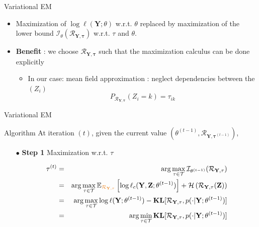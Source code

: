 \documentclass[compress,10pt]{beamer}
\newcommand{\bX}{\mathbf{Y}}
\newcommand{\Xall}{\mathbf{Y}}
\newcommand{\btau}{\mathbf{\tau}}
\newcommand{\bZ}{\mathbf{Z}}
\begin{document}
 \begin{frame}{Variational EM }
 

\begin{itemize}
\item Maximization of  $\log \ell(\Xall ; \theta)$  w.r.t.  $\theta$ replaced by maximization of the lower bound $\mathcal{I}_{\theta}(\mathcal{R}_{\Xall,\btau}) $  w.r.t.  $\tau$ and $\theta$. 
\item \textbf{Benefit} : we choose   $\mathcal{R}_{\Xall,\btau}$  such that the maximization calculus can be done explicitly
 \begin{itemize}
 \item In our case: mean field approximation : neglect dependencies between the  $(Z_i)$ 
 $$P_{\mathcal{R}_{\Xall,\btau}}(Z_i=k) = \tau_{ik}$$
  \end{itemize}



 \end{itemize}
  \end{frame}
 \begin{frame}{Variational  EM}


\begin{block}{Algorithm}
 \noindent At iteration $(t)$, given the current value  $(\theta^{(t-1)},\mathcal{R}_{\Xall, \btau^{(t-1)}})$,
\begin{enumerate}
\item[$\bullet$]\textbf{Step 1} Maximization w.r.t. $\tau$

\begin{eqnarray*}
\btau^{(t)}  &=&  \arg \max_{\btau  \in \mathcal{T}}  \mathcal{I}_{\theta^{(t-1)}}(\mathcal{R}_{\Xall,\btau})\\
 &=&  \arg \max_{\btau  \in \mathcal{T}}   \mathbb{E}_{\color{dgreen}\mathcal{R}_{\Xall,\btau}} \left[\log \ell_c(\bX,\bZ;  \theta^{(t-1)})   \right] +  \mathcal{H}\left(\mathcal{R}_{\Xall,\btau}(\bZ)\right) \\
&=&  \arg \max_{\btau  \in \mathcal{T}}  \log \ell(\Xall ; \theta^{(t-1)})  -  \mathbf{KL}[\mathcal{R}_{\Xall, \btau}, p(\cdot | \Xall; \theta^{(t-1)})]\\ 
&=& \arg \min_{\btau  \in \mathcal{T}}\mathbf{KL}[\mathcal{R}_{\Xall, \btau}, p(\cdot | \Xall; \theta^{(t-1)})]\\ 
 \end{eqnarray*}
 \end{enumerate}

 \end{block} 
 \end{frame}
\end{document}
